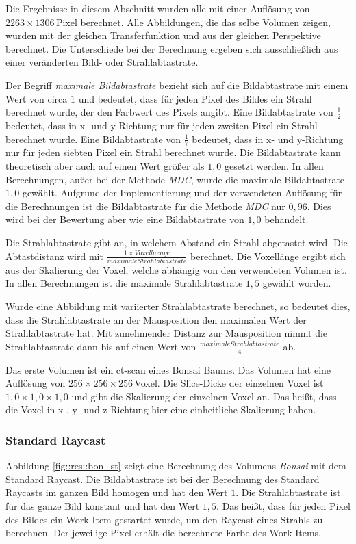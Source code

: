 Die Ergebnisse in diesem Abschnitt wurden alle mit einer Auflösung von $2263\times1306$\,Pixel berechnet.
Alle Abbildungen, die das selbe Volumen zeigen, wurden mit der gleichen Transferfunktion und aus der gleichen Perspektive berechnet.
Die Unterschiede bei der Berechnung ergeben sich ausschließlich aus einer veränderten Bild- oder Strahlabtastrate.

Der Begriff \emph{maximale Bildabtastrate} bezieht sich auf die Bildabtastrate mit einem Wert von circa $1$ und bedeutet, dass für jeden Pixel des Bildes ein Strahl berechnet wurde, der den Farbwert des Pixels angibt.
Eine Bildabtastrate von $\frac{1}{2}$ bedeutet, dass in x- und y-Richtung nur für jeden zweiten Pixel ein Strahl berechnet wurde.
Eine Bildabtastrate von $\frac{1}{7}$ bedeutet, dass in x- und y-Richtung nur für jeden siebten Pixel ein Strahl berechnet wurde.
Die Bildabtastrate kann theoretisch aber auch auf einen Wert größer als $1,0$ gesetzt werden.
In allen Berechnungen, außer bei der Methode \emph{MDC}, wurde die maximale Bildabtastrate $1,0$ gewählt.
Aufgrund der Implementierung und der verwendeten Auflösung für die Berechnungen ist die Bildabtastrate für die Methode \emph{MDC} nur $0,96$.
Dies wird bei der Bewertung aber wie eine Bildabtastrate von $1,0$ behandelt. 

Die Strahlabtastrate gibt an, in welchem Abstand ein Strahl abgetastet wird.
Die Abtastdistanz wird mit $\frac{1\times Voxellaenge}{maximale Strahlabtastrate}$ berechnet.
Die Voxellänge ergibt sich aus der Skalierung der Voxel, welche abhängig von den verwendeten Volumen ist.
In allen Berechnungen ist die maximale Strahlabtastrate $1,5$ gewählt worden.

Wurde eine Abbildung mit variierter Strahlabtastrate berechnet, so bedeutet dies, dass die Strahlabtastrate an der Mausposition den maximalen Wert der Strahlabtastrate hat.
Mit zunehmender Distanz zur Mausposition nimmt die Strahlabtastrate dann bis auf einen Wert von $\frac{maximale Strahlabtastrate}{4}$ ab.

Das erste Volumen ist ein ct-scan eines Bonsai Baums.
Das Volumen hat eine Auflösung von $256\times256\times256$\,Voxel.
Die Slice-Dicke der einzelnen Voxel ist $1,0\times1,0\times1,0$ und gibt die Skalierung der einzelnen Voxel an.
Das heißt, dass die Voxel in x-, y- und z-Richtung hier eine einheitliche Skalierung haben.

\subsubsection{Standard Raycast}\label{ss::res::sr}
Abbildung \ref{fig::res::bon_st} zeigt eine Berechnung des Volumens \emph{Bonsai} mit dem Standard Raycast.
Die Bildabtastrate ist bei der Berechnung des Standard Raycasts im ganzen Bild homogen und hat den Wert $1$.
Die Strahlabtastrate ist für das ganze Bild konstant und hat den Wert $1,5$.
Das heißt, dass für jeden Pixel des Bildes ein Work-Item gestartet wurde, um den Raycast eines Strahls zu berechnen.
Der jeweilige Pixel erhält die berechnete Farbe des Work-Items.

